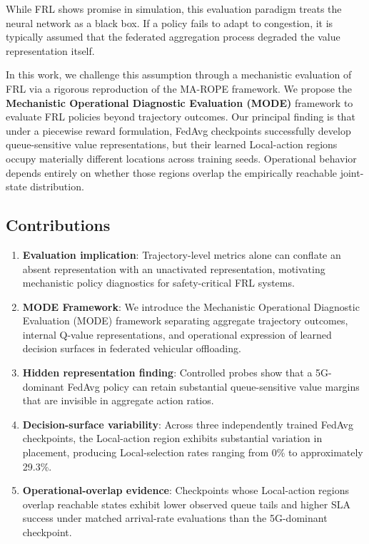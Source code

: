 \documentclass[conference]{IEEEtran}
\begin{document}
While FRL shows promise in simulation, this evaluation paradigm treats the neural network as a black box. If a policy fails to adapt to congestion, it is typically assumed that the federated aggregation process degraded the value representation itself. 

In this work, we challenge this assumption through a mechanistic evaluation of FRL via a rigorous reproduction of the MA-ROPE framework. We propose the \textbf{Mechanistic Operational Diagnostic Evaluation (MODE)} framework to evaluate FRL policies beyond trajectory outcomes. Our principal finding is that under a piecewise reward formulation, FedAvg checkpoints successfully develop queue-sensitive value representations, but their learned Local-action regions occupy materially different locations across training seeds. Operational behavior depends entirely on whether those regions overlap the empirically reachable joint-state distribution.

\vspace{0.1cm}
\noindent{}
\vspace{0.1cm}

\subsection{Contributions}
\begin{enumerate}
    \item \textbf{Evaluation implication}: Trajectory-level metrics alone can conflate an absent representation with an unactivated representation, motivating mechanistic policy diagnostics for safety-critical FRL systems.
    \item \textbf{MODE Framework}: We introduce the Mechanistic Operational Diagnostic Evaluation (MODE) framework separating aggregate trajectory outcomes, internal Q-value representations, and operational expression of learned decision surfaces in federated vehicular offloading.
    \item \textbf{Hidden representation finding}: Controlled probes show that a 5G-dominant FedAvg policy can retain substantial queue-sensitive value margins that are invisible in aggregate action ratios.
    \item \textbf{Decision-surface variability}: Across three independently trained FedAvg checkpoints, the Local-action region exhibits substantial variation in placement, producing Local-selection rates ranging from 0\% to approximately 29.3\%.
    \item \textbf{Operational-overlap evidence}: Checkpoints whose Local-action regions overlap reachable states exhibit lower observed queue tails and higher SLA success under matched arrival-rate evaluations than the 5G-dominant checkpoint.
\end{enumerate}
\end{document}

